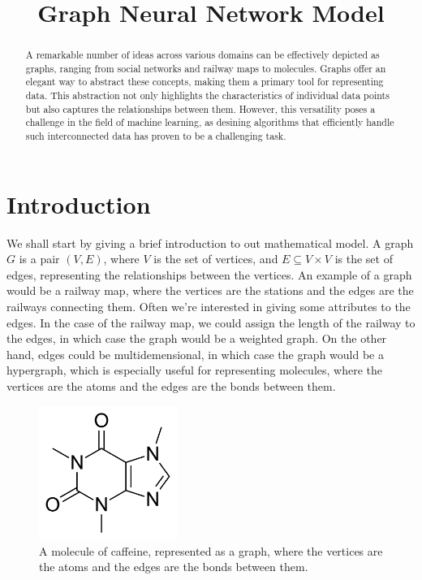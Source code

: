 \documentclass[12pt]{article}
\begin{document}
\title{Graph Neural Network Model}

\maketitle

\begin{abstract}
    A remarkable number of ideas across various domains can be effectively
    depicted as graphs, ranging from social networks and railway maps to
    molecules. Graphs offer an elegant way to abstract these concepts, making
    them a primary tool for representing data. This abstraction not only
    highlights the characteristics of individual data points but also captures
    the relationships between them. However, this versatility poses a challenge
    in the field of machine learning, as desining algorithms that efficiently
    handle such interconnected data has proven to be a challenging task.
\end{abstract}

\section{Introduction}
      We  shall  start  by  giving a brief introduction to out mathematical model. A
    graph  $G$  is  a  pair  $(V,  E)$,  where  $V$  is  the set of vertices, and $E
    \subseteq  V  \times  V$  is  the  set  of edges, representing the relationships
    between  the  vertices.  An  example  of  a  graph would be a railway map, where
    the  vertices  are  the  stations  and  the  edges  are  the railways connecting
    them.  Often  we're  interested  in  giving some attributes to the edges. In the
    case  of  the  railway  map,  we  could  assign the length of the railway to the
    edges,  in  which  case  the graph would be a weighted graph. On the other hand,
    edges   could   be  multidemensional,  in  which  case  the  graph  would  be  a
    hypergraph,  which  is  especially  useful for representing molecules, where the
    vertices are the atoms and the edges are the bonds between them.

     \begin{figure}[h]
         \centering
         \includegraphics[width=0.4\textwidth]{img/Caffeine_structure.png}
           \caption{A   molecule   of  caffeine,  represented  as  a  graph,  where  the
        vertices are the atoms and the edges are the bonds between them.}
         \label{fig:graph}
     \end{figure}
    
\end{document}
